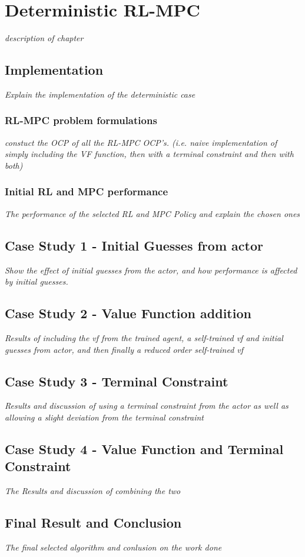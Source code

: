 \chapter{Deterministic RL-MPC}
\label{chapter:deterministic_RL_MPC}

\emph{description of chapter}

\section{Implementation}
\emph{Explain the implementation of the deterministic case}
\subsection{RL-MPC problem formulations}

\emph{constuct the OCP of all the RL-MPC OCP's. (i.e. naive implementation of simply including the VF function, then with a terminal constraint and then with both)}
\subsection{Initial RL and MPC performance}
\emph{The performance of the selected RL and MPC Policy and explain the chosen ones}

\section{Case Study 1 - Initial Guesses from actor}
\emph{Show the effect of initial guesses from the actor, and how performance is affected by initial guesses.}

\section{Case Study 2 - Value Function addition}
\emph{Results of including the vf from the trained agent, a self-trained vf and initial guesses from actor, and then finally a reduced order self-trained vf}

\section{Case Study 3 - Terminal Constraint}
\emph{Results and discussion of using a terminal constraint from the actor as well as allowing a slight deviation from the terminal constraint}

\section{Case Study 4 - Value Function and Terminal Constraint}
\emph{The Results and discussion of combining the two}

\section{Final Result and Conclusion}
\emph{The final selected algorithm and conlusion on the work done}


